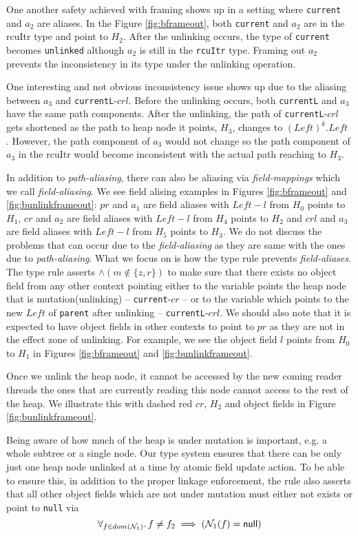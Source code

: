 One another safety achieved with framing shows up in a setting where \texttt{current} and $a_2$ are aliases. In the Figure \ref{fig:bframeout}, both \texttt{current} and $a_2$ are in the \textsf{rcuItr} type and point to $H_2$. After the unlinking occurs, the type of \texttt{current} becomes \texttt{unlinked} although $a_2$ is still in the \texttt{rcuItr} type. Framing out $a_2$ prevents the inconsistency in its type under the unlinking operation.

One interesting and not obvious inconsistency issue shows up due to the aliasing between $a_3$ and \texttt{currentL}-$crl$. Before the unlinking occurs, both \texttt{currentL} and $a_3$ have the same path components. After the unlinking, the path of \texttt{currentL}-$crl$ gets shortened as the path to heap node it points, $H_3$, changes  to $(Left)^{k}.Left$ . However, the path component of $a_3$  would not change so the path component of $a_3$ in the \textsf{rcuItr} would become inconsistent with the actual path reaching to $H_3$.

In addition to \textit{path-aliasing}, there can also be aliasing via \textit{field-mappings} which we call \textit{field-aliasing}. We see field alising examples in Figures \ref{fig:bframeout} and \ref{fig:bunlinkframeout}: $pr$ and $a_1$ are field aliases with $Left-l$ from $H_0$ points to $H_1$, $cr$ and $a_2$ are field aliases with $Left-l$ from $H_4$ points to $H_2$  and $crl$ and $a_3$ are field aliases with $Left-l$ from $H_5$ points to $H_3$. We do not discuss the problems that can occur due to the \textit{field-aliasing} as they are same with the ones due to \textit{path-aliasing}. What we focus on is how the type rule prevents \textit{field-aliases}. The type rule asserts $ \land (m\not\in\{z,r\} )$ to make sure that there exists no object field from any other context pointing either to the variable points the heap node that is mutation(unlinking) -- \texttt{current}-$cr$ -- or to the variable which points to the new $Left$ of \texttt{parent} after unlinking -- \texttt{currentL}-$crl$. We should also note that it is expected to have object fields in other contexts to point to $pr$ as they are not in the effect zone of unlinking. For example, we see the object field $l$ points from $H_0$ to  $H_1$ in Figures \ref{fig:bframeout} and \ref{fig:bunlinkframeout}.

Once we unlink the heap node, it cannot be accessed by the new coming reader threads the ones that are currently reading this node cannot access to the rest of the heap. We illustrate this with dashed red $cr$, $H_2$ and object fields in Figure \ref{fig:bunlinkframeout}.

Being aware of how much of the heap is under mutation is important, e.g. a whole subtree or a single node. Our type system ensures that there can be only just one heap node unlinked at a time by atomic field update action. To be able to ensure this, in addition to the proper linkage enforcement, the rule also asserts that all other object fields which are not under mutation must either not exists or point to \texttt{null} via
\[\forall_{f\in dom(\mathcal{N}_1)} \ldotp f\neq f_2 \implies (\mathcal{N}_1(f) = \textsf{null})\] 
